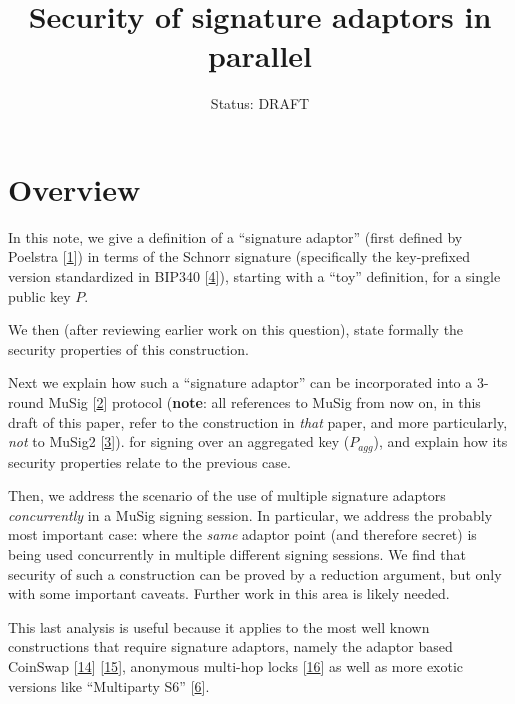 \documentclass[10pt,a4paper]{article}
\author{Status: DRAFT}
\begin{document}
\title{Security of signature adaptors in parallel}
\maketitle

\section{Overview}

In this note, we give a definition of a ``signature adaptor'' (first defined by Poelstra {[}\protect\hyperlink{anchor-1}{1}{]}) in terms of the Schnorr signature (specifically the key-prefixed version standardized in BIP340 {[}\protect\hyperlink{anchor-4}{4}{]}), starting with a ``toy'' definition, for a single public key $P$.

\vspace{5 pt}

We then (after reviewing earlier work on this question), state formally the security properties of this construction.

\vspace{5 pt}

Next we explain how such a ``signature adaptor'' can be incorporated into a 3-round MuSig {[}\protect\hyperlink{anchor-2}{2}{]} protocol (\textbf{note}: all references to MuSig from now on, in this draft of this paper, refer to the construction in \emph{that} paper, and more particularly, \emph{not} to MuSig2 {[}\protect\hyperlink{anchor-3}{3}{]}). for signing over an aggregated key ($P_{agg}$), and explain how its security properties relate to the previous case.

\vspace{5 pt}

Then, we address the scenario of the use of multiple signature adaptors  \emph{concurrently} in a MuSig signing session. In particular, we address the probably most important case: where the \emph{same} adaptor point (and therefore secret) is being used concurrently in multiple different signing sessions. We find that security of such a construction can be proved by a reduction argument, but only with some important caveats. Further work in this area is likely needed.

\vspace{5 pt}

This last analysis is useful because it applies to the most well known constructions that require signature adaptors, namely the adaptor based CoinSwap {[}\protect\hyperlink{anchor-14}{14}{]} {[}\protect\hyperlink{anchor-15}{15}{]}, anonymous multi-hop locks {[}\protect\hyperlink{anchor-16}{16}{]} as well as more exotic versions like ``Multiparty S6'' {[}\protect\hyperlink{anchor-6}{6}{]}.
\end{document}
